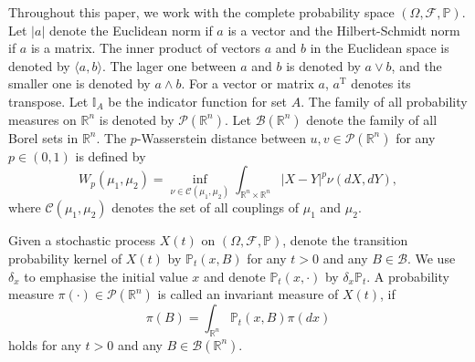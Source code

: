 \documentclass{article}
\begin{document}
Throughout this paper, we work with the complete probability space $(\Omega, \mathcal{F}, \mathbb{P})$. Let $|a|$ denote the Euclidean norm if $a$ is a vector and the Hilbert-Schmidt norm if $a$ is a matrix. The inner product of vectors $a$ and $b$ in the Euclidean space is denoted by $\langle a,b\rangle$. The lager one between $a$ and $b$ is denoted by $a\vee b$, and the smaller one is denoted by $a\wedge b$. For a vector or matrix $a$, $a^{\mathrm{T}}$ denotes its transpose. Let $\mathbb{I}_A$ be the indicator function for set $A$. The family of all probability measures on
$\mathbb{R}^n$ is denoted by $\mathcal{P}(\mathbb{R}^n)$. Let $\mathcal{B}(\mathbb{R}^n)$ denote the family of all Borel sets in $\mathbb{R}^n$. The $p$-Wasserstein distance between $u,v\in\mathcal{P}(\mathbb{R}^n)$ for any $p\in(0,1)$ is defined by 
\begin{equation*}
{W}_p(\mu_1,\mu_2)=\inf_{\nu\in\mathcal{C}(\mu_1,\mu_2)}\int_{\mathbb{R}^n\times\mathbb{R}^n}|X-Y|^p\nu(dX,dY),
\end{equation*}
where $\mathcal{C}(\mu_1,\mu_2)$ denotes the set of all couplings of $\mu_1$ and $\mu_2$.

Given a stochastic process $X(t)$ on $(\Omega, \mathcal{F}, \mathbb{P})$, denote the transition probability kernel of $X(t)$ by $\mathbb{P}_t(x,B)$ for any $t>0$ and any $B\in\mathcal{B}$. We use $\delta_x$ to emphasise the initial value $x$ and denote $\mathbb{P}_t(x,\cdot)$ by $\delta_x\mathbb{P}_t$. A probability measure $\pi(\cdot)\in\mathcal{P}(\mathbb{R}^n)$ is called an invariant measure of $X(t)$, if 
\begin{equation*}
\pi(B)=\int_{\mathbb{R}^n}\mathbb{P}_t(x,B)\pi(dx)
\end{equation*}
holds for any $t>0$ and any $B\in\mathcal{B}(\mathbb{R}^n)$.
\end{document}
